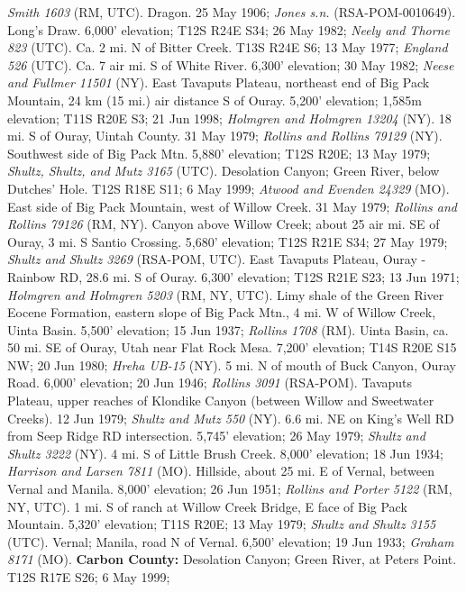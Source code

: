 \textit{Smith 1603} (RM, UTC).
Dragon. 25 May 1906; \textit{Jones s.n.} (RSA-POM-0010649).
Long's Draw. 6,000' elevation; T12S R24E S34; 26 May 1982;
\textit{Neely and Thorne 823} (UTC).
Ca. 2 mi. N of Bitter Creek. T13S R24E S6; 13 May 1977;
\textit{England 526} (UTC).
Ca. 7 air mi. S of White River. 6,300' elevation; 30 May 1982;
\textit{Neese and Fullmer 11501} (NY).
East Tavaputs Plateau, northeast end of Big Pack Mountain, 24 km (15 mi.) air
distance S of Ouray. 5,200' elevation; 1,585m elevation; T11S R20E S3;
21 Jun 1998; \textit{Holmgren and Holmgren 13204} (NY).
18 mi. S of Ouray, Uintah County. 31 May 1979;
\textit{Rollins and Rollins 79129} (NY).
Southwest side of Big Pack Mtn. 5,880' elevation; T12S R20E; 13 May 1979;
\textit{Shultz, Shultz, and Mutz 3165} (UTC).
Desolation Canyon; Green River, below Dutches' Hole. T12S R18E S11; 6 May 1999;
\textit{Atwood and Evenden 24329} (MO).
East side of Big Pack Mountain, west of Willow Creek. 31 May 1979;
\textit{Rollins and Rollins 79126} (RM, NY).
Canyon above Willow Creek; about 25 air mi. SE of Ouray, 3 mi. S Santio
Crossing. 5,680' elevation; T12S R21E S34; 27 May 1979;
\textit{Shultz and Shultz 3269} (RSA-POM, UTC).
East Tavaputs Plateau, Ouray - Rainbow RD, 28.6 mi. S of Ouray.
6,300' elevation; T12S R21E S23; 13 Jun 1971;
\textit{Holmgren and Holmgren 5203} (RM, NY, UTC).
Limy shale of the Green River Eocene Formation, eastern slope of Big Pack Mtn.,
4 mi. W of Willow Creek, Uinta Basin. 5,500' elevation; 15 Jun 1937;
\textit{Rollins 1708} (RM).
Uinta Basin, ca. 50 mi. SE of Ouray, Utah near Flat Rock Mesa.
7,200' elevation; T14S R20E S15 NW; 20 Jun 1980; \textit{Hreha UB-15} (NY).
5 mi. N of mouth of Buck Canyon, Ouray Road. 6,000' elevation;
20 Jun 1946; \textit{Rollins 3091} (RSA-POM).
Tavaputs Plateau, upper reaches of Klondike Canyon (between Willow and
Sweetwater Creeks). 12 Jun 1979; \textit{Shultz and Mutz 550} (NY).
6.6 mi. NE on King's Well RD from Seep Ridge RD intersection.
5,745' elevation; 26 May 1979; \textit{Shultz and Shultz 3222} (NY).
4 mi. S of Little Brush Creek. 8,000' elevation; 18 Jun 1934;
\textit{Harrison and Larsen 7811} (MO).
Hillside, about 25 mi. E of Vernal, between Vernal and Manila. 8,000' elevation;
26 Jun 1951; \textit{Rollins and Porter 5122} (RM, NY, UTC).
1 mi. S of ranch at Willow Creek Bridge, E face of Big Pack Mountain.
5,320' elevation; T11S R20E; 13 May 1979; \textit{Shultz and Shultz 3155} (UTC).
Vernal; Manila, road N of Vernal. 6,500' elevation; 19 Jun 1933;
\textit{Graham 8171} (MO).
  \textbf{Carbon County:}
Desolation Canyon; Green River, at Peters Point. T12S R17E S26; 6 May 1999;
